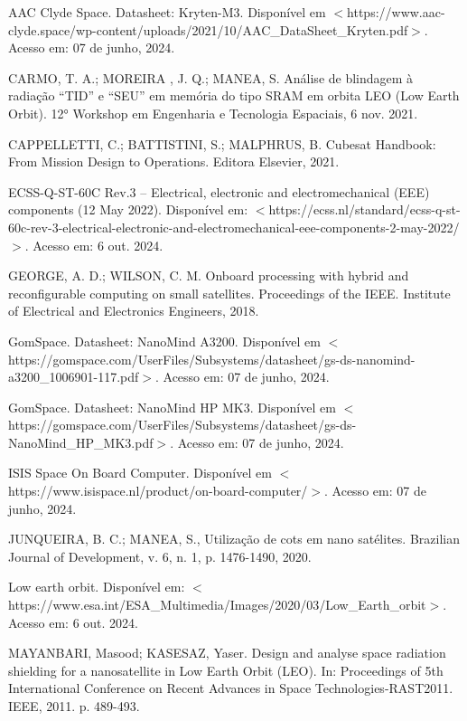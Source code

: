 \begin{flushleft}
\begin{thebibliography}{00}
 AAC Clyde Space. Datasheet: Kryten-M3. Disponível em $<$https://www.aac-clyde.space/wp-content/uploads/2021/10/AAC\_DataSheet\_Kryten.pdf$>$.  Acesso em: 07 de junho, 2024.

 CARMO, T. A.; MOREIRA , J. Q.; MANEA, S. Análise de blindagem à radiação “TID” e “SEU” em memória do tipo SRAM em orbita LEO (Low Earth Orbit). 12° Workshop em Engenharia e Tecnologia Espaciais, 6 nov. 2021.

 CAPPELLETTI, C.; BATTISTINI, S.; MALPHRUS, B. Cubesat Handbook: From Mission Design to Operations. Editora Elsevier, 2021.

 ECSS-Q-ST-60C Rev.3 – Electrical, electronic and electromechanical (EEE) components (12 May 2022). Disponível em: $<$https://ecss.nl/standard/ecss-q-st-60c-rev-3-electrical-electronic-and-electromechanical-eee-components-2-may-2022/$>$. Acesso em: 6 out. 2024.

 GEORGE, A. D.; WILSON, C. M. Onboard processing with hybrid and reconfigurable computing on small satellites. Proceedings of the IEEE. Institute of Electrical and Electronics Engineers, 2018.

 GomSpace. Datasheet: NanoMind A3200. Disponível em $<$https://gomspace.com/UserFiles/Subsystems/datasheet/gs-ds-nanomind-a3200\_1006901-117.pdf$>$. Acesso em: 07 de junho, 2024.

 GomSpace. Datasheet: NanoMind HP MK3. Disponível em $<$https://gomspace.com/UserFiles/Subsystems/datasheet/gs-ds-NanoMind\_HP\_MK3.pdf$>$. Acesso em: 07 de junho, 2024.

 ISIS Space On Board Computer. Disponível em $<$https://www.isispace.nl/product/on-board-computer/$>$. Acesso em: 07 de junho, 2024.

 JUNQUEIRA, B. C.; MANEA, S., Utilização de cots em nano satélites. Brazilian Journal of Development, v.
6, n. 1, p. 1476-1490, 2020.

 Low earth orbit. Disponível em: $<$https://www.esa.int/ESA\_Multimedia/Images/2020/03/Low\_Earth\_orbit$>$. Acesso em: 6 out. 2024.

 MAYANBARI, Masood; KASESAZ, Yaser. Design and analyse space radiation shielding for a nanosatellite in
Low Earth Orbit (LEO). In: Proceedings of 5th International Conference on Recent Advances in Space
Technologies-RAST2011. IEEE, 2011. p. 489-493.


\end{thebibliography}
\end{flushleft}
